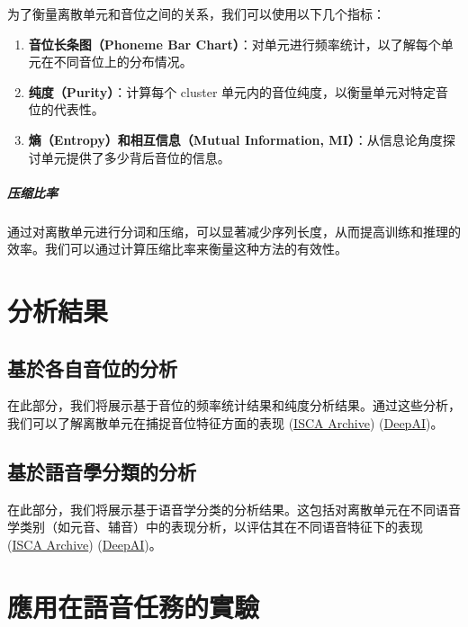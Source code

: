 为了衡量离散单元和音位之间的关系，我们可以使用以下几个指标：

\begin{enumerate}
    \item \textbf{音位长条图（Phoneme Bar Chart）}：对单元进行频率统计，以了解每个单元在不同音位上的分布情况。
    \item \textbf{纯度（Purity）}：计算每个 cluster 单元内的音位纯度，以衡量单元对特定音位的代表性。
    \item \textbf{熵（Entropy）和相互信息（Mutual Information, MI）}：从信息论角度探讨单元提供了多少背后音位的信息。
\end{enumerate}

\subparagraph{压缩比率}

通过对离散单元进行分词和压缩，可以显著减少序列长度，从而提高训练和推理的效率。我们可以通过计算压缩比率来衡量这种方法的有效性。

 


\section{分析結果}


\subsection{基於各自音位的分析}

在此部分，我们将展示基于音位的频率统计结果和纯度分析结果。通过这些分析，我们可以了解离散单元在捕捉音位特征方面的表现 (\href{https://www.isca-archive.org/interspeech_2022/ren22_interspeech.html}{ISCA Archive}) (\href{https://deepai.org/publication/speech-pre-training-with-acoustic-piece}{DeepAI})。

\subsection{基於語音學分類的分析}


在此部分，我们将展示基于语音学分类的分析结果。这包括对离散单元在不同语音学类别（如元音、辅音）中的表现分析，以评估其在不同语音特征下的表现 (\href{https://www.isca-archive.org/interspeech_2022/ren22_interspeech.html}{ISCA Archive}) (\href{https://deepai.org/publication/speech-pre-training-with-acoustic-piece}{DeepAI})。



 
\section{應用在語音任務的實驗}

